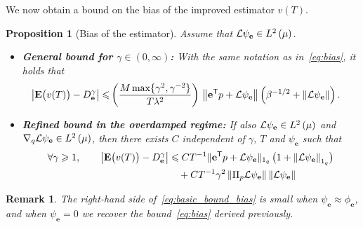\documentclass[11pt,a4paper]{article}
\newcommand{\expect}[0]{\mathbf{E}}
\newcommand{\grad}{\nabla}
\newcommand{\vect}[1]{\boldsymbol{\mathbf #1}}
\renewcommand{\t}{\mathsf T}
\theoremstyle{plain}
\newtheorem{proposition}{Proposition}[section]
\newtheorem{remark}{Remark}[section]
\numberwithin{equation}{section}
\renewcommand{\leq}{\leqslant}
\renewcommand{\geq}{\geqslant}
\begin{document}
We now obtain a bound on the bias of the improved estimator $v(T)$.
\begin{proposition}
    [Bias of the estimator]
    Assume that $\mathcal L \psi_{\vect e} \in \lp{2}{\mu}$.
    \begin{itemize}
        \item \textbf{General bound for $\gamma \in (0, \infty)$:}
            With the same notation as in~\eqref{eq:bias},
            it holds that
            \begin{align}
                \label{eq:basic_bound_bias}
                \abs{\expect \bigl( v(T) \bigr) - D^{\gamma}_{\vect e}}
                \leq & \left( \frac{M \max\{\gamma^2, \gamma^{-2}\}}{T \lambda^2 } \right) \,  \norm{\vect e^\t p + \mathcal L \psi_{\vect e}}  \left(\beta^{-1/2} + \norm{\mathcal L \psi_{\vect e}} \right).
            \end{align}
        \item \textbf{Refined bound in the overdamped regime:}
        If also $\mathcal L \psi_{\vect e} \in \lp{2}{\mu}$ and $\grad_q \mathcal L \psi_{\vect e} \in \lp{2}{\mu}$,
        then there exists $C$ independent of $\gamma$, $T$ and $\psi_{\vect e}$ such that
        \begin{align}
            \notag
            \forall \gamma \geq 1, \qquad
            \abs{\expect \bigl( v(T) \bigr) - D_{\vect e}^{\gamma}}
            &\leq C T^{-1}
            \norm*{\vect e^\t p +  \mathcal L \psi_{\vect e}}[1_q] \, \bigl(1 + \norm{\mathcal L \psi_{\vect e}}[1_q] \bigr) \\
            \label{eq:refined_bound}
            &\quad + C T^{-1} \gamma^2 \norm{\Pi_p \mathcal L \psi_{\vect e}} \norm{\mathcal L \psi_{\vect e}}
        \end{align}
    \end{itemize}
\end{proposition}
\begin{remark}
    The right-hand side of~\eqref{eq:basic_bound_bias} is small when $\psi_{\vect e} \approx \phi_{\vect e}$,
    and when $\psi_{\vect e} = 0$ we recover the bound~\eqref{eq:bias} derived previously.
\end{remark}
\end{document}
